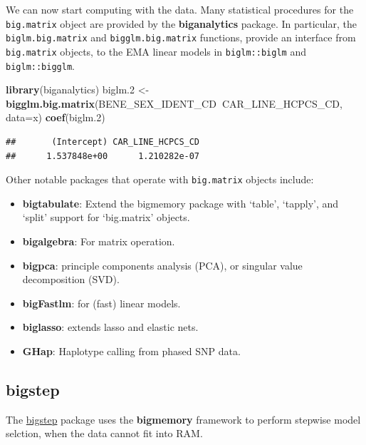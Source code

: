 \documentclass[]{book}
\newenvironment{Shaded}{\begin{snugshade}}{\end{snugshade}}
\newcommand{\KeywordTok}[1]{\textcolor[rgb]{0.13,0.29,0.53}{\textbf{#1}}}
\newcommand{\DataTypeTok}[1]{\textcolor[rgb]{0.13,0.29,0.53}{#1}}
\newcommand{\DecValTok}[1]{\textcolor[rgb]{0.00,0.00,0.81}{#1}}
\newcommand{\StringTok}[1]{\textcolor[rgb]{0.31,0.60,0.02}{#1}}
\newcommand{\OperatorTok}[1]{\textcolor[rgb]{0.81,0.36,0.00}{\textbf{#1}}}
\newcommand{\NormalTok}[1]{#1}
\providecommand{\tightlist}{%
  \setlength{\itemsep}{0pt}\setlength{\parskip}{0pt}}
\theoremstyle{definition}
\theoremstyle{definition}
\theoremstyle{definition}
\theoremstyle{remark}
\begin{document}
We can now start computing with the data. Many statistical procedures
for the \texttt{big.matrix} object are provided by the
\textbf{biganalytics} package. In particular, the
\texttt{biglm.big.matrix} and \texttt{bigglm.big.matrix} functions,
provide an interface from \texttt{big.matrix} objects, to the EMA linear
models in \texttt{biglm::biglm} and \texttt{biglm::bigglm}.

\begin{Shaded}
\begin{Highlighting}[]
\KeywordTok{library}\NormalTok{(biganalytics)}
\NormalTok{biglm.}\DecValTok{2}\NormalTok{ <-}\StringTok{ }\KeywordTok{bigglm.big.matrix}\NormalTok{(BENE_SEX_IDENT_CD}\OperatorTok{~}\NormalTok{CAR_LINE_HCPCS_CD, }\DataTypeTok{data=}\NormalTok{x)}
\KeywordTok{coef}\NormalTok{(biglm.}\DecValTok{2}\NormalTok{)}
\end{Highlighting}
\end{Shaded}

\begin{verbatim}
##       (Intercept) CAR_LINE_HCPCS_CD 
##      1.537848e+00      1.210282e-07
\end{verbatim}

Other notable packages that operate with \texttt{big.matrix} objects
include:

\begin{itemize}
\tightlist
\item
  \textbf{bigtabulate}: Extend the bigmemory package with `table',
  `tapply', and `split' support for `big.matrix' objects.
\item
  \textbf{bigalgebra}: For matrix operation.
\item
  \textbf{bigpca}: principle components analysis (PCA), or singular
  value decomposition (SVD).
\item
  \textbf{bigFastlm}: for (fast) linear models.
\item
  \textbf{biglasso}: extends lasso and elastic nets.
\item
  \textbf{GHap}: Haplotype calling from phased SNP data.
\end{itemize}

\subsection{bigstep}\label{bigstep}

The
\href{https://cran.r-project.org/web/packages/bigstep/vignettes/bigstep.html}{bigstep}
package uses the \textbf{bigmemory} framework to perform stepwise model
selction, when the data cannot fit into RAM.
\end{document}
